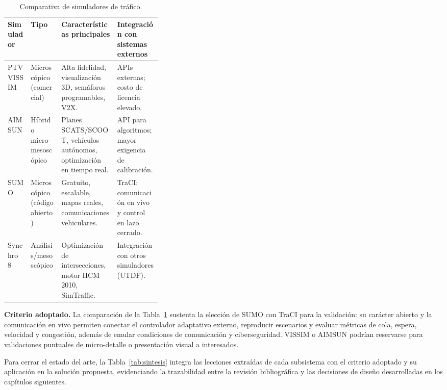 \begin{table}[H]
  \centering
  \footnotesize
  \caption{Comparativa de simuladores de tráfico.}
  \label{tab:simuladores}
  \begin{tabularx}{\linewidth}{@{}>{\raggedright\arraybackslash}p{0.15\linewidth}>{\raggedright\arraybackslash}p{0.20\linewidth}XX@{}}
    \toprule
    \textbf{Simulador} & \textbf{Tipo} & \textbf{Características principales} & \textbf{Integración con sistemas externos} \\
    \midrule
    PTV VISSIM & Microscópico (comercial) & Alta fidelidad, visualización 3D, semáforos programables, V2X. & APIs externas; costo de licencia elevado. \\
    AIMSUN & Híbrido micro-mesoscópico & Planes SCATS/SCOOT, vehículos autónomos, optimización en tiempo real. & API para algoritmos; mayor exigencia de calibración. \\
    SUMO & Microscópico (código abierto) & Gratuito, escalable, mapas reales, comunicaciones vehiculares. & TraCI: comunicación en vivo y control en lazo cerrado. \\
    Synchro 8 & Análisis/mesoscópico & Optimización de intersecciones, motor HCM 2010, SimTraffic. & Integración con otros simuladores (UTDF). \\
    \bottomrule
  \end{tabularx}
\end{table}

\textbf{Criterio adoptado.} La comparación de la Tabla~\ref{tab:simuladores} sustenta la elección de SUMO con
TraCI para la validación: su carácter abierto y la comunicación en vivo permiten conectar el controlador
adaptativo externo, reproducir escenarios y evaluar métricas de cola, espera, velocidad y congestión, además
de emular condiciones de comunicación y ciberseguridad. VISSIM o AIMSUN podrían reservarse para validaciones
puntuales de micro-detalle o presentación visual a interesados.

Para cerrar el estado del arte, la Tabla~\ref{tab:sintesis} integra las lecciones extraídas de cada
subsistema con el criterio adoptado y su aplicación en la solución propuesta, evidenciando la trazabilidad
entre la revisión bibliográfica y las decisiones de diseño desarrolladas en los capítulos siguientes.

